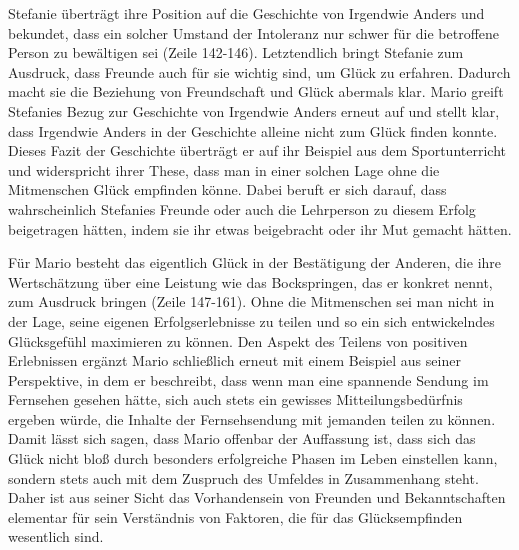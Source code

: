 Stefanie überträgt ihre Position auf die Geschichte von Irgendwie Anders und bekundet, dass ein solcher Umstand der Intoleranz nur schwer für die betroffene Person zu bewältigen sei (Zeile 142-146). 
Letztendlich bringt Stefanie zum Ausdruck, dass Freunde auch für sie wichtig sind, um Glück zu erfahren. 
Dadurch macht sie die Beziehung von Freundschaft und Glück abermals klar.
Mario greift Stefanies Bezug zur Geschichte von Irgendwie Anders erneut auf und stellt klar, dass Irgendwie Anders in der Geschichte alleine nicht zum Glück finden konnte. 
Dieses Fazit der Geschichte überträgt er auf ihr Beispiel aus dem Sportunterricht und widerspricht ihrer These, dass man in einer solchen Lage ohne die Mitmenschen Glück empfinden könne. 
Dabei beruft er sich darauf, dass wahrscheinlich Stefanies Freunde oder auch die Lehrperson zu diesem Erfolg beigetragen hätten, indem sie ihr etwas beigebracht oder ihr Mut gemacht hätten. 

Für Mario besteht das eigentlich Glück in der Bestätigung der Anderen, die ihre Wertschätzung über eine Leistung wie das Bockspringen, das er konkret nennt, zum Ausdruck bringen (Zeile 147-161). 
Ohne die Mitmenschen sei man nicht in der Lage, seine eigenen Erfolgserlebnisse zu teilen und so ein sich entwickelndes Glücksgefühl maximieren zu können. 
Den Aspekt des Teilens von positiven Erlebnissen ergänzt Mario schließlich erneut mit einem Beispiel aus seiner Perspektive, in dem er beschreibt, dass wenn man eine spannende Sendung im Fernsehen gesehen hätte, sich auch stets ein gewisses Mitteilungsbedürfnis ergeben würde, die Inhalte der Fernsehsendung mit jemanden teilen zu können. 
Damit lässt sich sagen, dass Mario offenbar der Auffassung ist, dass sich das Glück nicht bloß durch besonders erfolgreiche Phasen im Leben einstellen kann, sondern stets auch mit dem Zuspruch des Umfeldes in Zusammenhang steht. 
Daher ist aus seiner Sicht das Vorhandensein von Freunden und Bekanntschaften elementar für sein Verständnis von Faktoren, die für das Glücksempfinden wesentlich sind.

